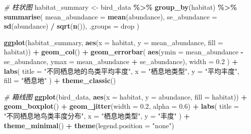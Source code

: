\documentclass[
]{book}
\newenvironment{Shaded}{\begin{snugshade}}{\end{snugshade}}
\newcommand{\AttributeTok}[1]{\textcolor[rgb]{0.13,0.29,0.53}{#1}}
\newcommand{\CommentTok}[1]{\textcolor[rgb]{0.56,0.35,0.01}{\textit{#1}}}
\newcommand{\FloatTok}[1]{\textcolor[rgb]{0.00,0.00,0.81}{#1}}
\newcommand{\FunctionTok}[1]{\textcolor[rgb]{0.13,0.29,0.53}{\textbf{#1}}}
\newcommand{\NormalTok}[1]{#1}
\newcommand{\OtherTok}[1]{\textcolor[rgb]{0.56,0.35,0.01}{#1}}
\newcommand{\SpecialCharTok}[1]{\textcolor[rgb]{0.81,0.36,0.00}{\textbf{#1}}}
\newcommand{\StringTok}[1]{\textcolor[rgb]{0.31,0.60,0.02}{#1}}
\begin{document}
\begin{Shaded}
\begin{Highlighting}[]
\CommentTok{\# 柱状图}
\NormalTok{habitat\_summary }\OtherTok{\textless{}{-}}\NormalTok{ bird\_data }\SpecialCharTok{\%\textgreater{}\%}
  \FunctionTok{group\_by}\NormalTok{(habitat) }\SpecialCharTok{\%\textgreater{}\%}
  \FunctionTok{summarise}\NormalTok{(}
    \AttributeTok{mean\_abundance =} \FunctionTok{mean}\NormalTok{(abundance),}
    \AttributeTok{se\_abundance =} \FunctionTok{sd}\NormalTok{(abundance) }\SpecialCharTok{/} \FunctionTok{sqrt}\NormalTok{(}\FunctionTok{n}\NormalTok{()),}
    \AttributeTok{.groups =} \StringTok{\textquotesingle{}drop\textquotesingle{}}
\NormalTok{  )}

\FunctionTok{ggplot}\NormalTok{(habitat\_summary, }\FunctionTok{aes}\NormalTok{(}\AttributeTok{x =}\NormalTok{ habitat, }\AttributeTok{y =}\NormalTok{ mean\_abundance, }\AttributeTok{fill =}\NormalTok{ habitat)) }\SpecialCharTok{+}
  \FunctionTok{geom\_col}\NormalTok{() }\SpecialCharTok{+}
  \FunctionTok{geom\_errorbar}\NormalTok{(}
    \FunctionTok{aes}\NormalTok{(}\AttributeTok{ymin =}\NormalTok{ mean\_abundance }\SpecialCharTok{{-}}\NormalTok{ se\_abundance, }
        \AttributeTok{ymax =}\NormalTok{ mean\_abundance }\SpecialCharTok{+}\NormalTok{ se\_abundance),}
    \AttributeTok{width =} \FloatTok{0.2}
\NormalTok{  ) }\SpecialCharTok{+}
  \FunctionTok{labs}\NormalTok{(}
    \AttributeTok{title =} \StringTok{"不同栖息地的鸟类平均丰度"}\NormalTok{,}
    \AttributeTok{x =} \StringTok{"栖息地类型"}\NormalTok{,}
    \AttributeTok{y =} \StringTok{"平均丰度"}\NormalTok{,}
    \AttributeTok{fill =} \StringTok{"栖息地"}
\NormalTok{  ) }\SpecialCharTok{+}
  \FunctionTok{theme\_classic}\NormalTok{()}

\CommentTok{\# 箱线图}
\FunctionTok{ggplot}\NormalTok{(bird\_data, }\FunctionTok{aes}\NormalTok{(}\AttributeTok{x =}\NormalTok{ habitat, }\AttributeTok{y =}\NormalTok{ abundance, }\AttributeTok{fill =}\NormalTok{ habitat)) }\SpecialCharTok{+}
  \FunctionTok{geom\_boxplot}\NormalTok{() }\SpecialCharTok{+}
  \FunctionTok{geom\_jitter}\NormalTok{(}\AttributeTok{width =} \FloatTok{0.2}\NormalTok{, }\AttributeTok{alpha =} \FloatTok{0.6}\NormalTok{) }\SpecialCharTok{+}
  \FunctionTok{labs}\NormalTok{(}
    \AttributeTok{title =} \StringTok{"不同栖息地鸟类丰度分布"}\NormalTok{,}
    \AttributeTok{x =} \StringTok{"栖息地类型"}\NormalTok{,}
    \AttributeTok{y =} \StringTok{"丰度"}
\NormalTok{  ) }\SpecialCharTok{+}
  \FunctionTok{theme\_minimal}\NormalTok{() }\SpecialCharTok{+}
  \FunctionTok{theme}\NormalTok{(}\AttributeTok{legend.position =} \StringTok{"none"}\NormalTok{)}
\end{Highlighting}
\end{Shaded}
\end{document}
